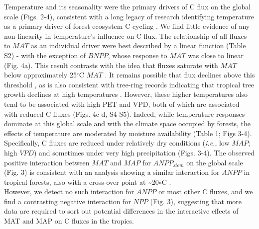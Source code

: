 \documentclass[
]{article}
\begin{document}
Temperature and its seasonality were the primary drivers of C flux on
the global scale (Figs. 2-4), consistent with a long legacy of research
identifying temperature as a primary driver of forest ecosystem C
cycling
\citep[e.g.,][]{lieth_primary_1973, luyssaert_co_2007, wei_forest_2010}.
We find little evidence of any non-linearity in temperature's influence
on C flux. The relationship of all fluxes to \(MAT\) as an individual
driver were best described by a linear function (Table S2) - with the
exception of \(BNPP\), whose response to \(MAT\) was close to linear
(Fig. 4a). This result contrasts with the idea that fluxes saturate with
\(MAT\) below approximately 25\(^\circ\)C \(MAT\)
\citep{luyssaert_co_2007, huston_global_2009}. It remains possible that
flux declines above this threshold
\citep{larjavaara_temperature_2012, sullivan_long-term_2020}, as is also
consistent with tree-ring records indicating that tropical tree growth
declines at high temperatures \citep[e.g.,][]{vlam_temperature_2014}.
However, these higher temperatures also tend to be associated with high
PET and VPD, both of which are associated with reduced C fluxes (Figs.
4c-d, S4-S5). Indeed, while temperature responses dominate at this
global scale and with the climate space occupied by forests, the effects
of temperature are moderated by moisture availability (Table 1; Figs
3-4). Specifically, C fluxes are reduced under relatively dry conditions
(\emph{i.e.}, low \(MAP\); high \(VPD\)) and sometimes under very high
precipitation (Figs. 3-4). The observed positive interaction between
\(MAT\) and \(MAP\) for \(ANPP_{stem}\) on the global scale (Fig. 3) is
consistent with an analysis showing a similar interaction for \(ANPP\)
in tropical forests, also with a cross-over point at
\textasciitilde20\(\circ\)C \citep{taylor_temperature_2017}.\\
However, we detect no such interaction for \(ANPP\) or most other C
fluxes, and we find a contrasting negative interaction for \(NPP\) (Fig.
3), suggesting that more data are required to sort out potential
differences in the interactive effects of MAT and MAP on C fluxes in the
tropics.
\end{document}
